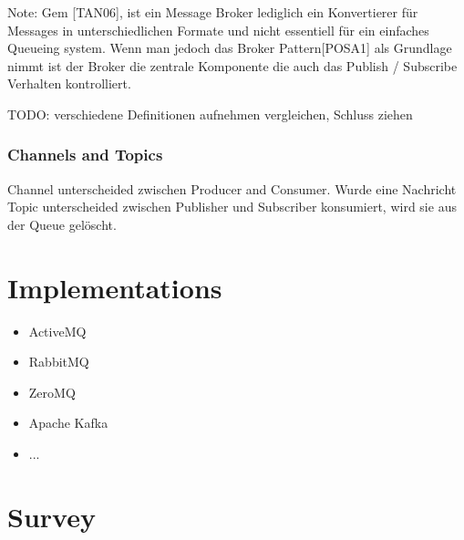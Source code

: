 Note: Gem [TAN06], ist ein Message Broker lediglich ein Konvertierer für
Messages in unterschiedlichen Formate und nicht essentiell für ein einfaches
Queueing system. Wenn man jedoch das Broker Pattern[POSA1] als Grundlage nimmt
ist der Broker die zentrale Komponente die auch das Publish / Subscribe
Verhalten kontrolliert. 

TODO: verschiedene Definitionen aufnehmen vergleichen, Schluss ziehen \\

\subsubsection{Channels and Topics} 
Channel unterscheided zwischen Producer and Consumer. Wurde eine Nachricht
Topic unterscheided zwischen Publisher und Subscriber
konsumiert, wird sie aus der Queue gelöscht. 
\section{Implementations}
\begin{itemize}
	\item ActiveMQ 
	\item RabbitMQ
	\item ZeroMQ
	\item Apache Kafka
	\item ... 
\end{itemize}
\section{Survey}


